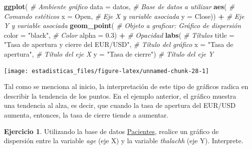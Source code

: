 \documentclass[
  11pt,
]{book}
\newenvironment{Shaded}{\begin{snugshade}}{\end{snugshade}}
\newcommand{\AttributeTok}[1]{\textcolor[rgb]{0.13,0.29,0.53}{#1}}
\newcommand{\CommentTok}[1]{\textcolor[rgb]{0.56,0.35,0.01}{\textit{#1}}}
\newcommand{\FloatTok}[1]{\textcolor[rgb]{0.00,0.00,0.81}{#1}}
\newcommand{\FunctionTok}[1]{\textcolor[rgb]{0.13,0.29,0.53}{\textbf{#1}}}
\newcommand{\NormalTok}[1]{#1}
\newcommand{\SpecialCharTok}[1]{\textcolor[rgb]{0.81,0.36,0.00}{\textbf{#1}}}
\newcommand{\StringTok}[1]{\textcolor[rgb]{0.31,0.60,0.02}{#1}}
\theoremstyle{definition}
\theoremstyle{definition}
\theoremstyle{definition}
\newtheorem{exercise}{Ejercicio}[chapter]
\theoremstyle{definition}
\theoremstyle{remark}
\begin{document}
\begin{Shaded}
\begin{Highlighting}[]
\FunctionTok{ggplot}\NormalTok{( }\CommentTok{\# Ambiente gráfico}
  \AttributeTok{data =}\NormalTok{ datos, }\CommentTok{\# Base de datos a utilizar}
  \FunctionTok{aes}\NormalTok{( }\CommentTok{\# Comando estéticos}
    \AttributeTok{x =}\NormalTok{ Open, }\CommentTok{\# Eje X y variable asociada}
    \AttributeTok{y =}\NormalTok{ Close)) }\SpecialCharTok{+} \CommentTok{\# Eje Y y variable asociada}
  \FunctionTok{geom\_point}\NormalTok{( }\CommentTok{\# Objeto a graficar: Gráfico de dispersión}
    \AttributeTok{color =} \StringTok{"black"}\NormalTok{, }\CommentTok{\# Color}
    \AttributeTok{alpha =} \FloatTok{0.3}\NormalTok{) }\SpecialCharTok{+} \CommentTok{\# Opacidad}
  \FunctionTok{labs}\NormalTok{( }\CommentTok{\# Títulos}
    \AttributeTok{title =} \StringTok{"Tasa de apertura y cierre del EUR/USD"}\NormalTok{, }\CommentTok{\# Título del gráfico}
    \AttributeTok{x =} \StringTok{"Tasa de apertura"}\NormalTok{, }\CommentTok{\# Título del eje X}
    \AttributeTok{y =} \StringTok{"Tasa de cierre"}\NormalTok{) }\CommentTok{\# Título del eje Y}
\end{Highlighting}
\end{Shaded}

\begin{center}\texttt{[image: estadisticas\_files/figure-latex/unnamed-chunk-28-1]} \end{center}

Tal como se menciona al inicio, la interpretación de este tipo de gráficos radica en describir la tendencia de los puntos. En el ejemplo anterior, el gráfico muestra una tendencia al alza, es decir, que cuando la tasa de apertura del EUR/USD aumenta, entonces, la tasa de cierre tiende a aumentar.

\begin{exercise}
Utilizando la base de datos \hyperref[Pacientes]{Pacientes}, realice un gráfico de dispersión entre la variable \emph{age} (eje X) y la variable \emph{thalachh} (eje Y). Interprete.
\end{exercise}
\end{document}
